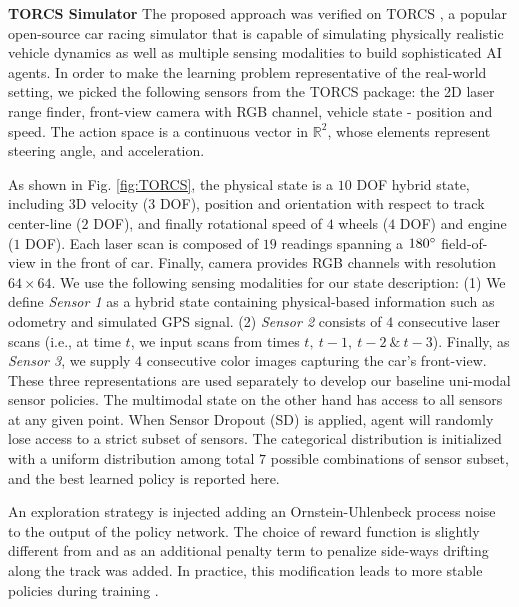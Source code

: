 \documentclass[../thesis.tex]{subfiles}
\begin{document}
\textbf{TORCS Simulator}
The proposed approach was verified on TORCS \cite{wymann2000torcs}, a popular open-source car racing simulator that is capable of simulating physically realistic vehicle dynamics as well as multiple sensing modalities \cite{GymTORCS} to build sophisticated AI agents. In order to make the learning problem representative of the real-world setting, we picked the following sensors from the TORCS package: the 2D laser range finder, front-view camera with RGB channel, vehicle state - position and speed. The action space is a continuous vector in $\mathbb{R}^2$, whose elements represent steering angle, and acceleration. 

As shown in Fig. \ref{fig:TORCS}, the physical state is a $10$ DOF hybrid state, including $3$D velocity ($3$ DOF), position and orientation with respect to track center-line ($2$ DOF), and finally rotational speed of $4$ wheels ($4$ DOF) and engine ($1$ DOF). Each laser scan is composed of $19$ readings spanning a $180\degree$ field-of-view in the front of car. Finally, camera provides RGB channels with resolution $64 \times 64$. We use the following sensing modalities for our state description: (1) We define \emph{Sensor 1} as a hybrid state containing physical-based information such as odometry and simulated GPS signal. (2) \emph{Sensor 2} consists of $4$ consecutive laser scans (i.e., at time $t$, we input scans from times $t,~ t-1,~t-2~\&~t-3$). Finally, as \emph{Sensor 3}, we supply $4$ consecutive color images capturing the car's front-view. These three representations are used separately to develop our baseline uni-modal sensor policies. The multimodal state on the other hand has access to all sensors at any given point. When Sensor Dropout (SD) is applied, agent will randomly lose access to a strict subset of sensors. The categorical distribution is initialized with a uniform distribution among total $7$ possible combinations of sensor subset, and the best learned policy is reported here. 

An exploration strategy is injected adding an Ornstein-Uhlenbeck process noise \cite{uhlenbeck1930theory} to the output of the policy network. The choice of reward function is slightly different from  \citet{DBLP:journals/corr/LillicrapHPHETS15} and \citet{A3C} as an additional penalty term to penalize side-ways drifting along the track was added. In practice, this modification leads to more stable policies during training \cite{BenLau16}. 
\end{document}
